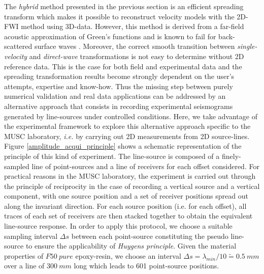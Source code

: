 \documentclass[paper,extra]{gji} %
\begin{document}




\noindent The \textit{hybrid} method presented in the previous section is an efficient spreading transform which makes it possible to reconstruct velocity models with the 2D-FWI method using 3D-data. However, this method is derived from a far-field acoustic approximation of Green's functions and is known to fail for back-scattered surface waves \citep{Schafer_LSS_2014}. Moreover, the correct smooth transition between \textit{single-velocity} and \textit{direct-wave} transformations is not easy to determine without 2D reference data. This is the case for both field and experimental data and the spreading transformation results become strongly dependent on the user's attempts, expertise and know-how.
\noindent Thus the missing step between purely numerical validation and real data applications can be addressed by an alternative approach that consists in recording experimental seismograms generated by line-sources under controlled conditions. Here, we take advantage of the experimental framework to explore this alternative approach specific to the MUSC laboratory, \textit{i.e.} by carrying out 2D measurements from 2D source-lines. Figure \ref{amplitude_acqui_principle} shows a schematic representation of the principle of this kind of experiment. The line-source is composed of a finely-sampled line of point-sources and a line of receivers for each offset considered. 
\noindent For practical reasons in the MUSC laboratory, the experiment is carried out through the principle of reciprocity in the case of recording a vertical source and a vertical component, with one source position and a set of receiver positions spread out along the invariant direction. For each source position (i.e. for each offset), all traces of each set of receivers are then stacked together to obtain the equivalent line-source response. In order to apply this protocol, we choose a suitable sampling interval $\Delta s$ between each point-source constituting the pseudo line-source to ensure the applicability of \textit{Huygens principle}. Given the material properties of $F50\ pure$ epoxy-resin, we choose an interval $\Delta s=\lambda_{min}/10 \tilde{=}0.5\ mm$ over a line of $300\ mm$ long which leads to 601 point-source positions.
\end{document}
